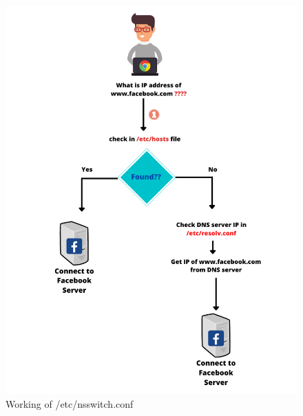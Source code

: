 \begin{flushleft}
	\begin{figure}[h!]
		\centering
		\includegraphics[scale=.6]{content/chapter3/images/hosts.png}
		\caption{Working of /etc/nsswitch.conf}
		\label{fig:dns_s}
	\end{figure}
	


\end{flushleft}

\newpage





